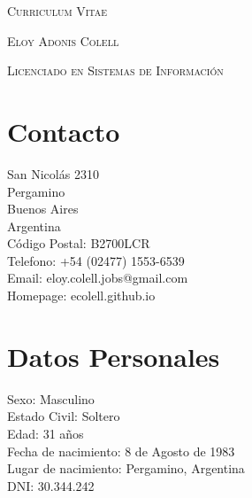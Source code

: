 \documentclass[a4paper]{article}
\begin{document}
\pagestyle{plain}

\begin{center}
\huge{\textsc{Curriculum Vitae}}
\vspace{\baselineskip}

\Large{\textsc{Eloy Adonis Colell}}
\vspace{\baselineskip}

\small{\textsc{Licenciado en Sistemas de Información}}
\end{center}
\vspace{1.5\baselineskip}

\section{Contacto}
\begin{flushleft}
San Nicolás 2310 \\
Pergamino \\
Buenos Aires \\
Argentina \\
Código Postal: B2700LCR \\
Telefono: +54 (02477) 1553-6539 \\
Email: eloy.colell.jobs@gmail.com \\
Homepage: ecolell.github.io\\
\end{flushleft}

\section{Datos Personales}
\begin{flushleft}
Sexo: Masculino \\
Estado Civil: Soltero \\
Edad: 31 años \\
Fecha de nacimiento: 8 de Agosto de 1983 \\
Lugar de nacimiento: Pergamino, Argentina \\
DNI: 30.344.242 \\
\end{flushleft}
\end{document}
